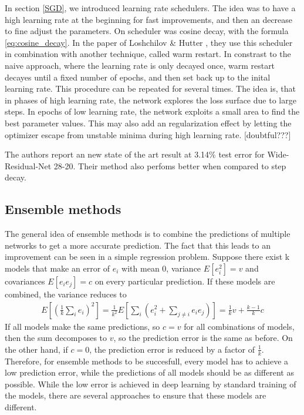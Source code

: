 In section \ref{SGD}, we introduced learning rate schedulers. The idea was to
have a high learning rate at the beginning for fast improvements, and then an
decrease to fine adjust the parameters. On scheduler was cosine decay, with the
formula \ref{eq:cosine_decay}. In the paper of Loshchilov \& Hutter
\cite{loshchilov2016sgdr}, they use this scheduler in combination with another
technique, called warm restart. In constrast to the naive approach, where the
learning rate is only decayed once, warm restart decayes until a fixed number of
epochs, and then set back up to the inital learning rate. This procedure can be
repeated for several times. The idea is, that in phases of high learning rate,
the network explores the loss surface due to large steps. In epochs of low
learning rate, the network exploits a small area to find the best parameter
values. This may also add an regularization effect by letting the optimizer
escape from unstable minima during high learning rate. [doubtful???]

The authors report an new state of the art result at 3.14\% test error for
Wide-Residual-Net 28-20. Their method also perfoms better when compared to step
decay.
\subsection{Ensemble methods}\label{sub:Ensemble_Methods}
The general idea of ensemble methods is to combine the predictions of multiple
networks to get a more accurate prediction. The fact that this leads to an
improvement can be seen in a simple regression problem. Suppose there exist k
models that make an error of $e_i$ with mean 0, variance $E[e_i^2]=v$ and
covariances $E[e_i e_j]=c$ on every particular prediction. If these models are
combined, the variance reduces to 
\begin{align}
    E[(\frac{1}{k} \sum_i e_i)^2]=\frac{1}{k^2}E[\sum_i (e_i^2 + \sum_{j\neq i} e_i e_j)]=\frac{1}{k}v+\frac{k-1}{k}c
\end{align}
If all models make the same predictions, so $c=v$ for all combinations of
models, then the sum decomposes to $v$, so the prediction error is the same as
before. On the other hand, if $c=0$, the prediction error is reduced by a factor
of $\frac{1}{k}$. Therefore, for ensemble methods to be succesfull, every model
has to achieve a low prediction error, while the predictions of all models
should be as different as possible. While the low error is achieved in deep
learning by standard training of the models, there are several approaches to
ensure that these models are different. 

